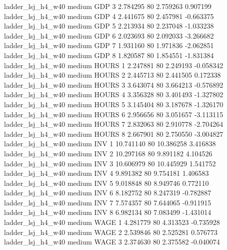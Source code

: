   ladder_lsj_h4_w40     medium      GDP                 3  2.784295 80       2.759263           0.907199
  ladder_lsj_h4_w40     medium      GDP                 4  2.441675 80       2.457981          -0.663375
  ladder_lsj_h4_w40     medium      GDP                 5  2.213934 80       2.237048          -1.033238
  ladder_lsj_h4_w40     medium      GDP                 6  2.023693 80       2.092033          -3.266682
  ladder_lsj_h4_w40     medium      GDP                 7  1.931160 80       1.971836          -2.062851
  ladder_lsj_h4_w40     medium      GDP                 8  1.820587 80       1.854551          -1.831384
  ladder_lsj_h4_w40     medium    HOURS                 1  2.247881 80       2.249193          -0.058342
  ladder_lsj_h4_w40     medium    HOURS                 2  2.445713 80       2.441505           0.172338
  ladder_lsj_h4_w40     medium    HOURS                 3  3.643074 80       3.664213          -0.576892
  ladder_lsj_h4_w40     medium    HOURS                 4  3.356328 80       3.401493          -1.327802
  ladder_lsj_h4_w40     medium    HOURS                 5  3.145404 80       3.187678          -1.326170
  ladder_lsj_h4_w40     medium    HOURS                 6  2.956656 80       3.051657          -3.113115
  ladder_lsj_h4_w40     medium    HOURS                 7  2.832063 80       2.910778          -2.704264
  ladder_lsj_h4_w40     medium    HOURS                 8  2.667901 80       2.750550          -3.004827
  ladder_lsj_h4_w40     medium      INV                 1 10.741140 80      10.386258           3.416838
  ladder_lsj_h4_w40     medium      INV                 2 10.297168 80       9.891182           4.104526
  ladder_lsj_h4_w40     medium      INV                 3 10.606979 80      10.445929           1.541752
  ladder_lsj_h4_w40     medium      INV                 4  9.891382 80       9.754181           1.406583
  ladder_lsj_h4_w40     medium      INV                 5  9.018848 80       8.949746           0.772110
  ladder_lsj_h4_w40     medium      INV                 6  8.182752 80       8.247319          -0.782887
  ladder_lsj_h4_w40     medium      INV                 7  7.574357 80       7.644065          -0.911915
  ladder_lsj_h4_w40     medium      INV                 8  6.982134 80       7.083499          -1.431014
  ladder_lsj_h4_w40     medium     WAGE                 1  4.281779 80       4.313523          -0.735928
  ladder_lsj_h4_w40     medium     WAGE                 2  2.539846 80       2.525281           0.576773
  ladder_lsj_h4_w40     medium     WAGE                 3  2.374630 80       2.375582          -0.040074
